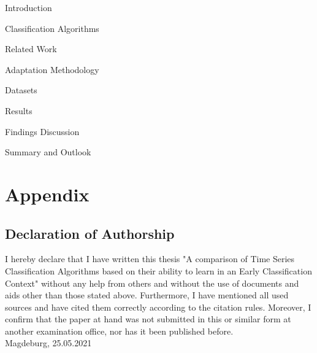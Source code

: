 \renewcommand*\contentsname{Table of Contents}
\tableofcontents
\thispagestyle{empty}
 
 \null\newpage
{} 






\thispagestyle{empty}
\null\newpage
{}
{Introduction}
\null\newpage

{Classification Algorithms}
\null\newpage

{Related Work}
\null\newpage

{Adaptation Methodology}
\null\newpage

{Datasets}
\null\newpage

{Results}
\null\newpage

{Findings Discussion}
\null\newpage

{Summary and Outlook}

\chapter*{Appendix}

\null\newpage

% 
\printbibliography
\newpage

\section{Declaration of Authorship}
I hereby declare that I have written this thesis "A comparison of Time Series Classification Algorithms based on their ability to learn in an Early Classification Context"
without any help from others and without the use of documents and aids
other than those stated above. Furthermore, I have mentioned all used
sources and have cited them correctly according to the citation rules.
Moreover, I confirm that the paper at hand was not submitted in this or
similar form at another examination office, nor has it been published
before.
\\
Magdeburg, 25.05.2021